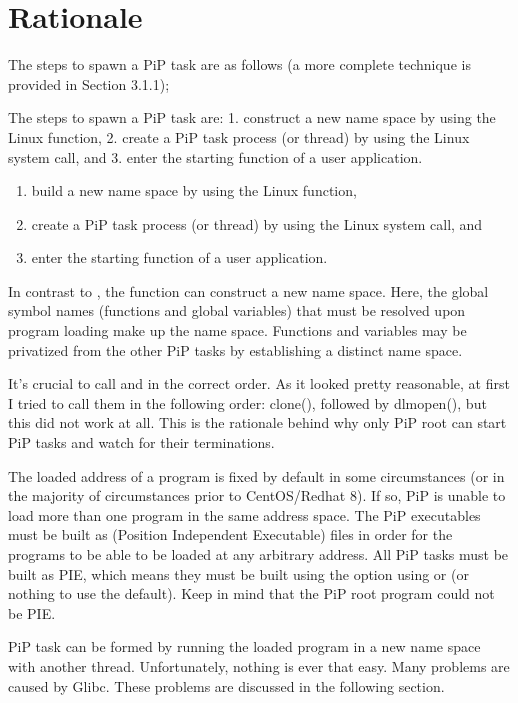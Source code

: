 
\section{Rationale}\label{sec:rationale}

The steps to spawn a PiP task are as follows (a more complete
technique is provided in Section 3.1.1);

The steps to spawn a PiP task are: 1. construct a new name space by
using the Linux  function, 2. create a PiP task
process (or thread) by using the Linux  system call,
and 3. enter the starting function of a user application.


\begin{enumerate}
\item build a new name space by
using the Linux  function,
\item create a PiP task process (or
thread) by using the Linux  system call, and
\item enter the starting function of a user application.
\end{enumerate}

In contrast to , the  function
can construct a new name space. Here, the global symbol names
(functions and global variables) that must be resolved upon program
loading make up the name space. Functions and variables may be
privatized from the other PiP tasks by establishing a distinct name
space. 

It's crucial to call  and  in the
correct order. As it looked pretty reasonable, at first I tried to
call them in the following order: clone(), followed by dlmopen(), but
this did not work at all. This is the rationale behind why only PiP
root can start PiP tasks and watch for their terminations. 

The loaded address of a program is fixed by default in some
circumstances (or in the majority of circumstances prior to
CentOS/Redhat 8). If so, PiP is unable to load more than one program
in the same address space. The PiP executables must be built as \PIE
(Position Independent Executable) files in order for the programs to
be able to be loaded at any arbitrary address. All PiP tasks must be
built as PIE, which means they must be built using the
 option using  or
 (or nothing to use the default). Keep in mind 
that the PiP root program could not be PIE.

PiP task can be formed by running the loaded program in a new name
space with another thread. Unfortunately, nothing is ever that
easy. Many problems are caused by Glibc. These problems are discussed
in the following section.
